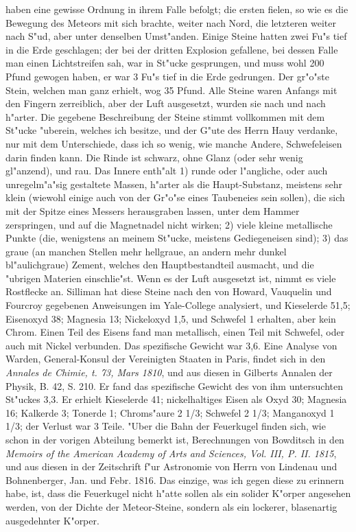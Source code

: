 \documentclass[a4paper, 11pt, oneside, polutonikogreek, german]{article}
\begin{document}
haben eine gewisse Ordnung in ihrem Falle befolgt; die ersten fielen, so wie es die Bewegung des Meteors mit sich brachte, weiter nach Nord, die letzteren weiter nach S"ud, aber unter denselben Umst"anden. Einige Steine hatten zwei Fu"s tief in die Erde geschlagen; der bei der dritten Explosion gefallene, bei dessen Falle man einen Lichtstreifen sah, war in St"ucke gesprungen, und muss wohl 200 Pfund gewogen haben, er war 3 Fu"s tief in die Erde gedrungen. Der gr"o"ste Stein, welchen man ganz erhielt, wog 35 Pfund. Alle Steine waren Anfangs mit den Fingern zerreiblich, aber der Luft ausgesetzt, wurden sie nach und nach h"arter. Die gegebene Beschreibung der Steine stimmt vollkommen mit dem St"ucke "uberein, welches ich besitze, und der G"ute des Herrn Hauy verdanke, nur mit dem Unterschiede, dass ich so wenig, wie manche Andere, Schwefeleisen darin finden kann. Die Rinde ist schwarz, ohne Glanz (oder sehr wenig gl"anzend), und rau. Das Innere enth"alt 1) runde oder l"angliche, oder auch unregelm"a"sig gestaltete Massen, h"arter als die Haupt-Substanz, meistens sehr klein (wiewohl einige auch von der Gr"o"se eines Taubeneies sein sollen), die sich mit der Spitze eines Messers herausgraben lassen, unter dem Hammer zerspringen, und auf die Magnetnadel nicht wirken; 2) viele kleine metallische Punkte (die, wenigstens an meinem St"ucke, meistens Gediegeneisen sind); 3) das graue (an manchen Stellen mehr hellgraue, an andern mehr dunkel bl"aulichgraue) Zement, welches den Hauptbestandteil ausmacht, und die "ubrigen Materien einschlie"st. Wenn es der Luft ausgesetzt ist, nimmt es viele Rostflecke an. Silliman hat diese Steine nach den von Howard, Vauquelin und Fourcroy gegebenen Anweisungen im Yale-College analysiert, und Kieselerde 51,5; Eisenoxyd 38; Magnesia 13; Nickeloxyd 1,5, und Schwefel 1 erhalten, aber kein Chrom. Einen Teil des Eisens fand man metallisch, einen Teil mit Schwefel, oder auch mit Nickel verbunden. Das spezifische Gewicht war 3,6. Eine Analyse von Warden, General-Konsul der Vereinigten Staaten in Paris, findet sich in den \emph{Annales de Chimie, t. 73, Mars 1810}, und aus diesen in Gilberts Annalen der Physik, B. 42, S. 210. Er fand das spezifische Gewicht des von ihm untersuchten St"uckes 3,3. Er erhielt Kieselerde 41; nickelhaltiges Eisen als Oxyd 30; Magnesia 16; Kalkerde 3; Tonerde 1; Chroms"aure 2 1/3; Schwefel 2 1/3; Manganoxyd 1 1/3; der Verlust war 3 Teile. "Uber die Bahn der Feuerkugel finden sich, wie schon in der vorigen Abteilung bemerkt ist, Berechnungen von Bowditsch in den \emph{Memoirs of the American Academy of Arts and Sciences, Vol. III, P. II. 1815}, und aus diesen in der Zeitschrift f"ur Astronomie von Herrn von Lindenau und Bohnenberger, Jan. und Febr. 1816. Das einzige, was ich gegen diese zu erinnern habe, ist, dass die Feuerkugel nicht h"atte sollen als ein solider K"orper angesehen werden, von der Dichte der Meteor-Steine, sondern als ein lockerer, blasenartig ausgedehnter K"orper.
\end{document}
